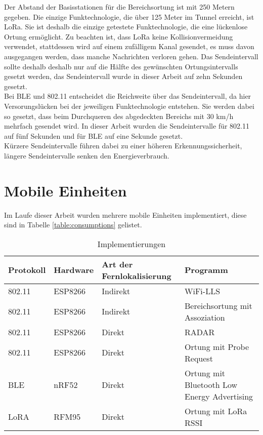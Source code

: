Der Abstand der Basisstationen für die Bereichsortung ist mit 250 Metern gegeben. 
Die einzige Funktechnologie, die über 125 Meter im Tunnel erreicht, ist LoRa.
Sie ist deshalb die einzige getestete Funktechnologie, die eine lückenlose Ortung ermöglicht.
Zu beachten ist, dass LoRa keine Kollisionvermeidung verwendet, stattdessen wird auf einem zufälligem Kanal gesendet, es muss davon ausgegangen werden, dass manche Nachrichten verloren gehen.
Das Sendeintervall sollte deshalb deshalb nur auf die Hälfte des gewünschten Ortungsintervalls gesetzt werden, das Sendeintervall wurde in dieser Arbeit auf zehn Sekunden gesetzt.\\
Bei BLE und 802.11 entscheidet die Reichweite über das Sendeintervall, da hier Versorungslücken bei der jeweiligen Funktechnologie entstehen.
Sie werden dabei so gesetzt, dass beim Durchqueren des abgedeckten Bereichs mit 30 km/h mehrfach gesendet wird.
In dieser Arbeit wurden die Sendeintervalle für 802.11 auf fünf Sekunden und für BLE auf eine Sekunde gesetzt.\\
Kürzere Sendeintervalle führen dabei zu einer höheren Erkennungssicherheit, längere Sendeintervalle senken den Energieverbrauch.

\section{Mobile Einheiten}
Im Laufe dieser Arbeit wurden mehrere mobile Einheiten implementiert, diese sind in Tabelle \ref{table:consumptions} gelistet.

\begin{table}[h]
	\centering
	\caption{Implementierungen}
	\label{table:ranges}
	\begin{tabular}{p{2cm}|p{2.5cm}|p{2.5cm}|p{5.8cm}}
		Protokoll & Hardware & Art der Fernlokalisierung & Programm \\
		\hline
		802.11 & ESP8266 & Indirekt & WiFi-LLS \cite{chen2007design} \\
		802.11 & ESP8266 & Indirekt & Bereichsortung mit Assoziation \\
		\hline
		802.11 & ESP8266 & Direkt & RADAR \cite{bahl2000radar} \\
		802.11 & ESP8266 & Direkt & Ortung mit Probe Request \\
		\hline
		BLE & nRF52 & Direkt & Ortung mit Bluetooth Low Energy Advertising \cite{jianyong2014rssi} \\
		\hline
		LoRA & RFM95 & Direkt & Ortung mit LoRa RSSI \cite{kim2016poster} \\
	\end{tabular}
\end{table}

